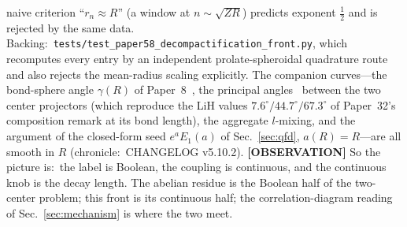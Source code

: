 \documentclass[aps,pra,twocolumn,superscriptaddress,longbibliography]{revtex4-2}
\begin{document}
naive criterion ``$r_n \approx R$'' (a window at $n \sim \sqrt{ZR}$)
predicts exponent $\tfrac12$ and is rejected by the same data.  Backing:\
\texttt{tests/test\_paper58\_decompactification\_front.py}, which
recomputes every entry by an independent prolate-spheroidal quadrature
route and also rejects the mean-radius scaling explicitly.  The
companion curves---the bond-sphere angle $\gamma(R)$ of
Paper~8~\cite{loutey_paper8}, the principal
angles~\cite{amos_hall1961,king1967,west_ruedenberg2013} between the two
center projectors (which reproduce the LiH values
$7.6^\circ/44.7^\circ/67.3^\circ$ of Paper~32's composition remark at
its bond length), the aggregate $l$-mixing, and the argument of the
closed-form seed $e^{a}E_1(a)$ of Sec.~\ref{sec:qfd}, $a(R) = R$---are
all smooth in $R$ (chronicle:\ CHANGELOG v5.10.2).  \textbf{[OBSERVATION]}
So the picture is:\ the label is Boolean, the coupling is continuous, and
the continuous knob is the decay length.  The abelian residue is the
Boolean half of the two-center problem; this front is its continuous half;
the correlation-diagram reading of Sec.~\ref{sec:mechanism} is where the
two meet.
\end{document}
